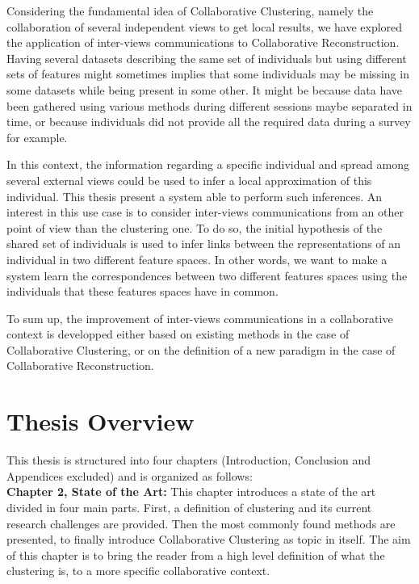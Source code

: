 Considering the fundamental idea of Collaborative Clustering, namely the collaboration of several independent views to get local results, we have explored the application of inter-views communications to Collaborative Reconstruction. Having several datasets describing the same set of individuals but using different sets of features might sometimes implies that some individuals may be missing in some datasets while being present in some other. It might be because data have been gathered using various methods during different sessions maybe separated in time, or because individuals did not provide all the required data during a survey for example. 

In this context, the information regarding a specific individual and spread among several external views could be used to infer a local approximation of this individual. This thesis present a system able to perform such inferences. An interest in this use case is to consider inter-views communications from an other point of view than the clustering one. To do so, the initial hypothesis of the shared set of individuals is used to infer links between the representations of an individual in two different feature spaces. In other words, we want to make a system learn the correspondences between two different features spaces using the individuals that these features spaces have in common.

To sum up, the improvement of inter-views communications in a collaborative context is developped either based on existing methods in the case of Collaborative Clustering, or on the definition of a new paradigm in the case of Collaborative Reconstruction.

\section{Thesis Overview}

This thesis is structured into four chapters (Introduction, Conclusion and Appendices excluded) and is organized as follows:\\

\textbf{Chapter 2, State of the Art:} This chapter introduces a state of the art divided in four main parts. First, a definition of clustering and its current research challenges are provided. Then the most commonly found methods are presented, to finally introduce Collaborative Clustering as topic in itself. The aim of this chapter is to bring the reader from a high level definition of what the clustering is, to a more specific collaborative context.\\

